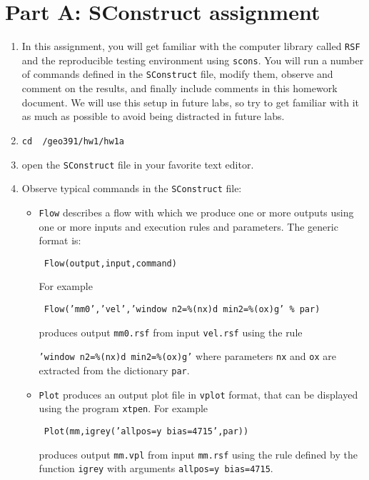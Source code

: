 
\section{Part A: SConstruct assignment}

\begin{enumerate}

\item In this assignment, you will get familiar with 
the computer library called \texttt{RSF} and the reproducible testing
environment using \texttt{scons}.
You will run a number of commands defined in the 
\texttt{SConstruct} file, modify them, 
observe and comment on the results, and finally include comments
in this homework document.
We will use this setup in future labs, so try to get familiar with
it as much as possible to avoid being distracted in future labs.

\item \texttt{cd ~/geo391/hw1/hw1a}

\item open the \texttt{SConstruct} file in your favorite text editor.

\item Observe typical commands in the \texttt{SConstruct} file:
\begin{itemize}
\item \texttt{Flow} describes a flow with which we produce 
one or more outputs using one or more inputs and execution rules and
parameters. The generic format is:
\par
\texttt{ Flow(output,input,command) }
\par
For example
\par
\texttt{ Flow('mm0','vel','window n2=\%(nx)d min2=\%(ox)g' \% par)}
\par
produces output \texttt{mm0.rsf} from input \texttt{vel.rsf} using the rule
\par
\texttt{'window n2=\%(nx)d min2=\%(ox)g'} where parameters
\texttt{nx} and \texttt{ox} are extracted from the dictionary \texttt{par}.

\item \texttt{Plot} produces an output plot file 
in \texttt{vplot} format, that can be displayed using the program 
\texttt{xtpen}.
For example
\par
\texttt{ Plot(mm,igrey('allpos=y bias=4715',par))}
\par
produces output \texttt{mm.vpl} from input 
\texttt{mm.rsf} using the rule defined by the function 
\texttt{igrey} with arguments \texttt{allpos=y bias=4715}.


\end{itemize}
\end{enumerate}
